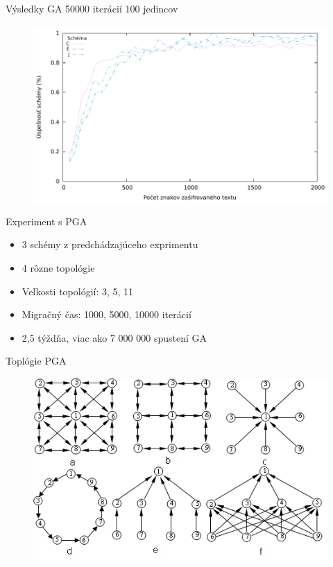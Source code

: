 \documentclass{beamer}
\begin{document}
\begin{frame}{Výsledky GA 50000 iterácií 100 jedincov}
  \begin{figure}
    \includegraphics[scale=0.75]{img/GA_CEJ_50000_100.pdf}
  \end{figure}
\end{frame}

\begin{frame}{Experiment s PGA}
  \begin{itemize}
  \item 3 schémy z predchádzajúceho exprimentu
  \item 4 rôzne topológie
  \item Veľkosti topológií: 3, 5, 11
  \item Migračný čas: 1000, 5000, 10000 iterácií
  \item 2,5 týždňa, viac ako 7 000 000 spustení GA
  \end{itemize}
\end{frame}

\begin{frame}{Toplógie PGA}
  \begin{figure}
    \includegraphics[scale=0.5]{img/topology.png}
  \end{figure}  
\end{frame}
\end{document}
